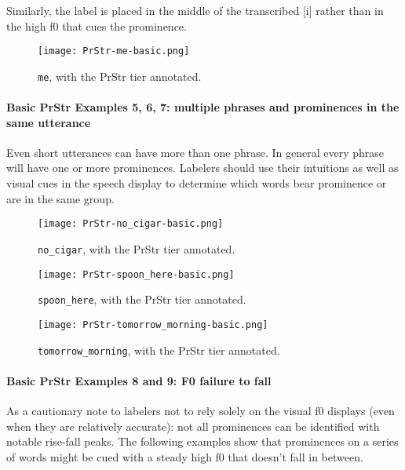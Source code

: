Similarly, the \textlabel{*} label is placed in the middle of the transcribed [i] rather than in the high f0 that cues the prominence. 

\begin{figure}[H]
\centering
%
\texttt{[image: PrStr-me-basic.png]}
%
\caption{\texttt{me}, with the PrStr tier annotated.%
\label{fig:me PrStr}%
%
}
\end{figure}

\paragraph{Basic PrStr Examples 5, 6, 7: multiple phrases and prominences in the same utterance}

Even short utterances can have more than one phrase. In general every phrase will have one or more prominences.  Labelers should use their intuitions as well as visual cues in the speech display to determine which words bear prominence or are in the same group.

\begin{figure}[H]
\centering
%
\texttt{[image: PrStr-no\_cigar-basic.png]}
%
\caption{\texttt{no\_cigar}, with the PrStr tier annotated.%
\label{fig:no_cigar PrStr}%
%
}
\end{figure}

\begin{figure}[H]
\centering
%
\texttt{[image: PrStr-spoon\_here-basic.png]}
%
\caption{\texttt{spoon\_here}, with the PrStr tier annotated.%
\label{fig:spoon_here PrStr}%
%
}
\end{figure}

\begin{figure}[H]
\centering
%
\texttt{[image: PrStr-tomorrow\_morning-basic.png]}
%
\caption{\texttt{tomorrow\_morning}, with the PrStr tier annotated.%
\label{fig:tomorrow_morning PrStr}%
%
}
\end{figure}

\paragraph{Basic PrStr Examples 8 and 9: F0 failure to fall}
As a cautionary note to labelers not to rely solely on the visual f0 displays (even when they are relatively accurate): not all prominences can be identified with notable rise-fall peaks. The following examples show that prominences on a series of words might be cued with a steady high f0 that doesn’t fall in between. 

